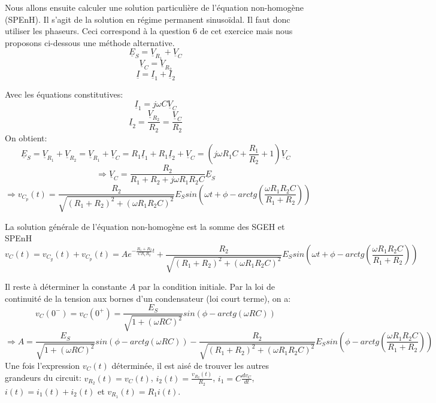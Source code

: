{Nous allons ensuite calculer une solution particulière de l'équation non-homogène (SPEnH). Il s'agit de la solution en régime permanent sinusoïdal. Il faut donc utiliser les phaseurs. Ceci correspond à la question 6 de cet exercice mais nous proposons ci-dessous une méthode alternative.
$$\underline{E}_S=\underline{V}_{R_1}+\underline{V}_C$$
$$\underline{V}_C=\underline{V}_{R_2}$$
$$\underline{I}=\underline{I}_1+\underline{I}_2$$

Avec les équations constitutives:
$$\underline{I}_1=j\omega C\underline{V}_C$$
$$\underline{I}_2=\frac{\underline{V}_{R_2}}{R_2}=\frac{\underline{V}_{C}}{R_2}$$
On obtient:
$$\underline{E}_S=\underline{V}_{R_1}+\underline{V}_{R_2}=\underline{V}_{R_1}+\underline{V}_{C}=R_1\underline{I}_1+R_1\underline{I}_2+\underline{V}_C=(j\omega R_1C+\frac{R_1}{R_2}+1)\underline{V}_C$$
$$\Rightarrow \underline{V}_C=\frac{R_2}{R_1+R_2+j\omega R_1 R_2 C}\underline{E}_S$$
$$\Rightarrow v_{C_p}(t)=\frac{R_2}{\sqrt{(R_1+R_2)^2+(\omega R_1R_2C)^2}}E_S sin(\omega t+\phi-arctg(\frac{\omega R_1R_2C}{R_1+R_2}))$$

La solution générale de l'équation non-homogène est la somme des SGEH et SPEnH 
$$v_C(t)=v_{C_g}(t)+v_{C_p}(t)=Ae^{-\frac{R_{1}+R_{2}}{CR_{1}R_{2}}t}+\frac{R_2}{\sqrt{(R_1+R_2)^2+(\omega R_1R_2C)^2}}E_S sin(\omega t+\phi-arctg(\frac{\omega R_1R_2C}{R_1+R_2}))$$

Il reste à déterminer la constante $A$ par la condition initiale. Par la loi de continuité de la tension aux bornes d'un condensateur (loi court terme), on a:
$$v_C(0^-)=v_C(0^+)=\frac{E_S}{\sqrt{1+(\omega RC)^2}}sin(\phi-arctg(\omega RC))$$
$$\Rightarrow A=\frac{E_S}{\sqrt{1+(\omega RC)^2}}sin(\phi-arctg(\omega RC))-\frac{R_2}{\sqrt{(R_1+R_2)^2+(\omega R_1R_2C)^2}}E_S sin(\phi-arctg(\frac{\omega R_1R_2C}{R_1+R_2}))$$
Une fois l'expression $v_C(t)$ déterminée, il est aisé de trouver les autres grandeurs du circuit:
$v_{R_2}(t)=v_C(t)$, $i_2(t)=\frac{v_{R_2}(t)}{R_2}$, $i_1=C\frac{dv_C}{dt}$, $i(t)=i_1(t)+i_2(t)$ et $v_{R_1}(t)=R_1 i(t)$.


}
